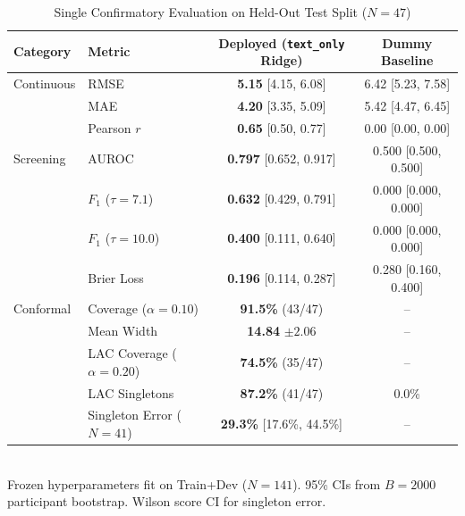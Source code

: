 \begin{table}[t]
\centering
\small
\caption{Single Confirmatory Evaluation on Held-Out Test Split ($N=47$)}
\label{tab:test_evaluation}
\begin{tabular}{llcc}
\toprule
\textbf{Category} & \textbf{Metric} & \textbf{Deployed (\texttt{text\_only} Ridge)} & \textbf{Dummy Baseline} \\
\midrule
Continuous & RMSE & \textbf{5.15} [4.15, 6.08] & 6.42 [5.23, 7.58] \\
& MAE & \textbf{4.20} [3.35, 5.09] & 5.42 [4.47, 6.45] \\
& Pearson $r$ & \textbf{0.65} [0.50, 0.77] & 0.00 [0.00, 0.00] \\
\midrule
Screening & AUROC & \textbf{0.797} [0.652, 0.917] & 0.500 [0.500, 0.500] \\
& $F_1$ ($\tau=7.1$) & \textbf{0.632} [0.429, 0.791] & 0.000 [0.000, 0.000] \\
& $F_1$ ($\tau=10.0$) & \textbf{0.400} [0.111, 0.640] & 0.000 [0.000, 0.000] \\
& Brier Loss & \textbf{0.196} [0.114, 0.287] & 0.280 [0.160, 0.400] \\
\midrule
Conformal & Coverage ($\alpha=0.10$) & \textbf{91.5\%} (43/47) & -- \\
& Mean Width & \textbf{14.84} $\pm 2.06$ & -- \\
& LAC Coverage ($\alpha=0.20$) & \textbf{74.5\%} (35/47) & -- \\
& LAC Singletons & \textbf{87.2\%} (41/47) & 0.0\% \\
& Singleton Error ($N=41$) & \textbf{29.3\%} [17.6\%, 44.5\%] & -- \\
\bottomrule
\end{tabular}
\\[2pt]
\footnotesize{Frozen hyperparameters fit on Train+Dev ($N=141$). 95\% CIs from $B=2000$ participant bootstrap. Wilson score CI for singleton error.}
\end{table}
